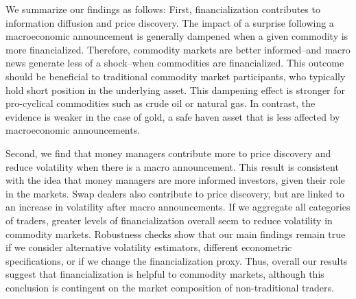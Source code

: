 \documentclass[12pt]{article}
\begin{document}
We summarize our findings as follows: First, financialization contributes to information diffusion and price discovery. The impact of a surprise following a macroeconomic announcement is generally dampened when a given commodity is more financialized. Therefore, commodity markets are better informed--and macro news generate less of a shock--when commodities are financialized. This outcome should be beneficial to traditional commodity market participants, who typically hold short position in the underlying asset.  This dampening effect is stronger for pro-cyclical commodities such as crude oil or natural gas. In contrast, the evidence is weaker in the case of gold, a safe haven asset that is less affected by macroeconomic announcements. 

Second, we find that money managers contribute more to price discovery and reduce volatility when there is a macro announcement. This result is consistent with the idea that money managers are more informed investors, given their role in the markets. Swap dealers also contribute to price discovery, but are linked to an increase in volatility after macro announcements. If we aggregate all categories of traders, greater levels of financialization overall seem to reduce volatility in commodity markets. Robustness checks show that our main findings remain true if we consider alternative volatility estimators, different econometric specifications, or if we change the financialization proxy. Thus, overall our results suggest that financialization is helpful to commodity markets, although this conclusion is contingent on the market composition of non-traditional traders. %
\end{document}
